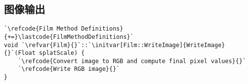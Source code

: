 \subsection{图像输出}\label{sub:图像输出}
\begin{lstlisting}
`\refcode{Film Method Definitions}{+=}\lastcode{FilmMethodDefinitions}`
void `\refvar{Film}{}`::`\initvar[Film::WriteImage]{WriteImage}{}`(Float splatScale) {
    `\refcode{Convert image to RGB and compute final pixel values}{}`
    `\refcode{Write RGB image}{}`
}
\end{lstlisting}